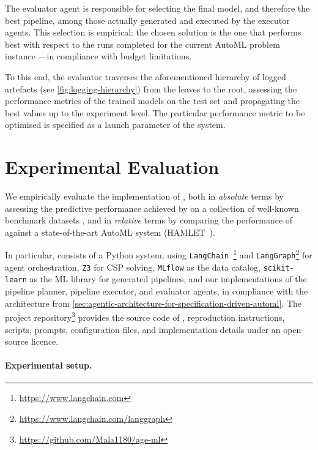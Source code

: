 \documentclass[runningheads]{llncs}
\begin{document}
The evaluator agent is responsible for selecting the final model,
and therefore the best pipeline,
among those actually generated and executed by the executor agents.
%
This selection is empirical:
the chosen solution is the one that performs best
with respect to the runs completed for the current \ac{AutoML} problem instance%
---in compliance with budget limitations.

To this end,
the evaluator traverses the aforementioned hierarchy of logged artefacts
(see \cref{fig:logging-hierarchy})
from the leaves to the root,
assessing the performance metrics of the trained models on the test set and propagating the best values up to the experiment level.
%
The particular performance metric to be optimised is specified as a launch parameter of the system.

\section{Experimental Evaluation}
\label{sec:experimental-evaluation}

We empirically evaluate the implementation of \ourapproach{},
both in \emph{absolute} terms
\textendash{} by assessing the predictive performance achieved by \ourapproach{} on a collection of well-known benchmark datasets \textendash{},
and in \emph{relative} terms%
\textemdash{}by comparing the performance of \ourapproach{} against a state-of-the-art \ac{AutoML} system
(HAMLET~\cite{FranciaGP23}).

In particular,
\ourapproach{} consists of a Python system,
using 
\texttt{LangChain}~\cite{Mavroudis2024}\footnote{\url{https://www.langchain.com}} 
and 
\texttt{LangGraph}\footnote{\url{https://www.langchain.com/langgraph}} for agent orchestration,
\texttt{Z3} for \ac{CSP} solving,
\texttt{MLflow} as the data catalog,
\texttt{scikit-learn} as the \ac{ML} library for generated pipelines,
and our implementations of the pipeline planner, pipeline executor, and evaluator agents,
in compliance with the architecture from \cref{sec:agentic-architecture-for-specification-driven-automl}.
%
The project repository\footnote{\label{url:repo}\url{https://github.com/Mala1180/age-ml}}
provides the source code of \ourapproach{}, reproduction instructions, scripts, prompts, configuration files, and implementation details under an open-source licence.

\paragraph{Experimental setup.}
\label{subsec:experimental-design}
\end{document}
